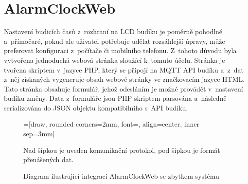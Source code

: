 \section{AlarmClockWeb}
Nastavení budicích časů z~rozhraní na LCD budíku je poměrně pohodlné
a~přímočaré, pokud ale uživatel potřebuje udělat rozsáhlejší úpravy, může
preferovat konfiguraci z~počítače či mobilního telefonu.
Z~tohoto důvodu byla vytvořena jednoduchá webová stránka sloužící k~tomuto
účelu. Stránka je tvořena skriptem v~jazyce PHP, který se připojí na MQTT API
budíku a~z~dat z~něj získaných vygeneruje obsah webové stránky ve značkovacím
jazyce HTML. Tato stránka obsahuje formulář, jehož odesláním je možné provádět
v~nastavení budíku změny. Data z~formuláře jsou PHP skriptem parsována
a~následně serializována do JSON objektu kompatibilního s~API budíku.


\begin{figure}[htbp]
    \centering
    =[draw, rounded corners=2mm, font={\bfseries}, align=center, inner sep=3mm]

    {\footnotesize Nad šipkou je uveden komunikační protokol, pod šipkou je
    formát přenášených dat.}
    \caption{Diagram ilustrující integraci AlarmClockWeb se zbytkem systému}
    \label{fig:web blok}
\end{figure}


